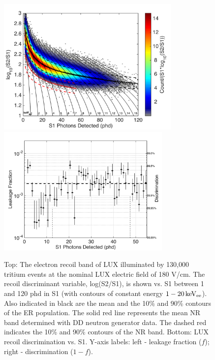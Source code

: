 \begin{figure}[h!]\centering
\includegraphics[width=90mm]{fig/CH3T_ER_Band.png}
\includegraphics[width=85mm]{fig/CH3T_Leakage_Run03.png}
\caption{Top: The electron recoil band of LUX illuminated by 130,000 tritium events at the nominal LUX electric field of 180 V/cm.  The recoil discriminant variable, log(S2/S1), is shown vs. S1 between 1 and 120 phd in S1 (with contours of constant energy $\rm1-20 \, keV_{ee}$). Also indicated in black are the mean and the 10\% and 90\% contours of the ER population. The solid red line represents the mean NR band determined with DD neutron generator data. The dashed red indicates the 10\% and 90\% contours of the NR band. Bottom: LUX recoil discrimination vs. S1. Y-axis labels: left -  leakage fraction ($f$); right - discrimination ($1-f$).}
\label{fig:ER_band}
\end{figure}




